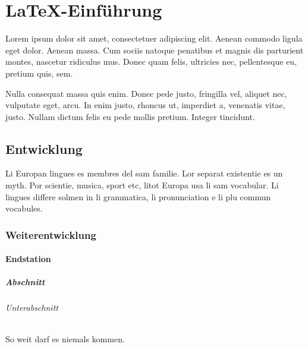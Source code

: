 \chapter{LaTeX-Einführung}
\label{chapter:LaTeX-Einfeuhrung}
Lorem ipsum dolor sit amet, consectetuer adipiscing elit. Aenean commodo ligula eget dolor. Aenean massa. Cum sociis natoque penatibus et magnis dis parturient montes, nascetur ridiculus mus. Donec quam felis, ultricies nec, pellentesque eu, pretium quis, sem.\par\bigskip
Nulla consequat massa quis enim. Donec pede justo, fringilla vel, aliquet nec, vulputate eget, arcu. In enim justo, rhoncus ut, imperdiet a, venenatis vitae, justo. Nullam dictum felis eu pede mollis pretium. Integer tincidunt.
\section{Entwicklung}
\label{section:Entwicklung}
Li Europan lingues es membres del sam familie. Lor separat existentie es un myth. Por scientie, musica, sport etc, litot Europa usa li sam vocabular. Li lingues differe solmen in li grammatica, li pronunciation e li plu commun vocabules.
\subsection{Weiterentwicklung}
\label{subsection:Weiterentwicklung}
\subsubsection{Endstation}
\label{subsubsection:Endstation}
\paragraph{Abschnitt}
\label{paragraph:Abschnitt}
\subparagraph{Unterabschnitt}
\label{subparagraph:Unterabschnitt}
So weit darf es niemals kommen.

